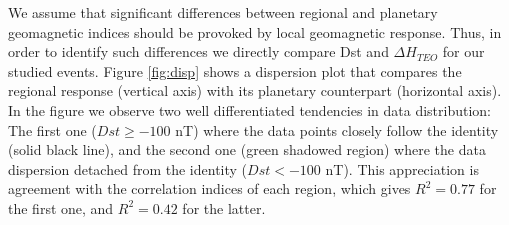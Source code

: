 \documentclass[a4paper,fleqn]{cas-dc}
\begin{document}
We assume that significant differences between regional and planetary geomagnetic indices should be provoked by local geomagnetic response. Thus, in order to identify such
differences we directly compare Dst and $\Delta H_{TEO}$ for our studied events. Figure \ref{fig:disp} shows a dispersion plot that compares the regional response (vertical axis) with its planetary counterpart (horizontal axis). In the figure we observe two well differentiated tendencies in data distribution: The first one ($Dst \geq -100$ nT) where the data points closely follow the identity (solid black line), and the second one (green shadowed region) where the data dispersion detached from the identity ($Dst < -100$ nT). This appreciation is agreement with the correlation indices of each region, which gives $R^2 = 0.77$ for the first one, and $R^2 = 0.42$ for the latter.




\end{document}
